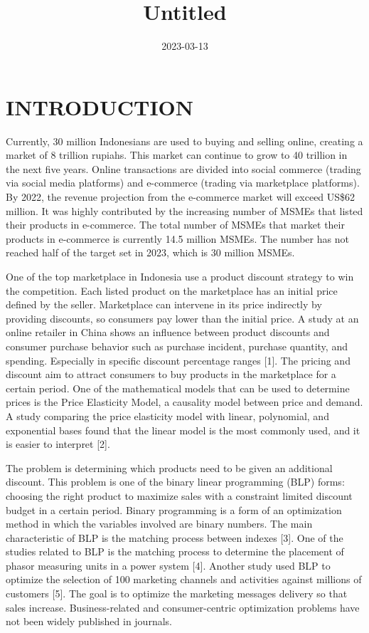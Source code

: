 \documentclass[
]{article}
\title{Untitled}
\author{}
\date{\vspace{-2.5em}2023-03-13}
\begin{document}
\maketitle

\hypertarget{introduction}{%
\section{INTRODUCTION}\label{introduction}}

Currently, 30 million Indonesians are used to buying and selling online,
creating a market of 8 trillion rupiahs. This market can continue to
grow to 40 trillion in the next five years. Online transactions are
divided into social commerce (trading via social media platforms) and
e-commerce (trading via marketplace platforms). By 2022, the revenue
projection from the e-commerce market will exceed US\$62 million. It was
highly contributed by the increasing number of MSMEs that listed their
products in e-commerce. The total number of MSMEs that market their
products in e-commerce is currently 14.5 million MSMEs. The number has
not reached half of the target set in 2023, which is 30 million MSMEs.

One of the top marketplace in Indonesia use a product discount strategy
to win the competition. Each listed product on the marketplace has an
initial price defined by the seller. Marketplace can intervene in its
price indirectly by providing discounts, so consumers pay lower than the
initial price. A study at an online retailer in China shows an influence
between product discounts and consumer purchase behavior such as
purchase incident, purchase quantity, and spending. Especially in
specific discount percentage ranges {[}1{]}. The pricing and discount
aim to attract consumers to buy products in the marketplace for a
certain period. One of the mathematical models that can be used to
determine prices is the Price Elasticity Model, a causality model
between price and demand. A study comparing the price elasticity model
with linear, polynomial, and exponential bases found that the linear
model is the most commonly used, and it is easier to interpret {[}2{]}.

The problem is determining which products need to be given an additional
discount. This problem is one of the binary linear programming (BLP)
forms: choosing the right product to maximize sales with a constraint
limited discount budget in a certain period. Binary programming is a
form of an optimization method in which the variables involved are
binary numbers. The main characteristic of BLP is the matching process
between indexes {[}3{]}. One of the studies related to BLP is the
matching process to determine the placement of phasor measuring units in
a power system {[}4{]}. Another study used BLP to optimize the selection
of 100 marketing channels and activities against millions of customers
{[}5{]}. The goal is to optimize the marketing messages delivery so that
sales increase. Business-related and consumer-centric optimization
problems have not been widely published in journals.
\end{document}
